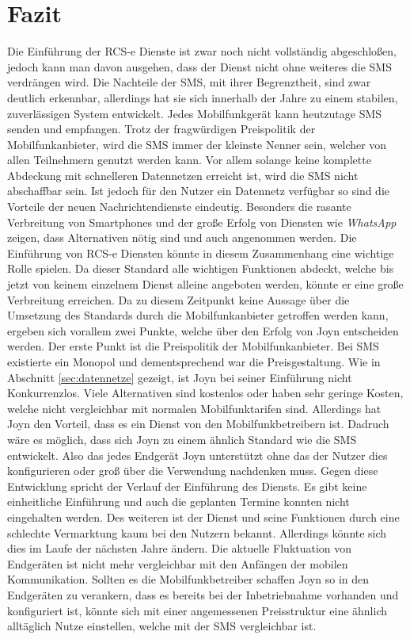 \documentclass[german,12pt,a4paper]{article}
\begin{document}


\section{Fazit} %
\label{sec:fazit}

Die Einführung der RCS-e Dienste ist zwar noch nicht vollständig abgeschloßen, jedoch
kann man davon ausgehen, dass der Dienst nicht ohne weiteres die SMS verdrängen wird. Die
Nachteile der SMS, mit ihrer Begrenztheit, sind zwar deutlich erkennbar, allerdings hat sie sich innerhalb
der Jahre zu einem stabilen, zuverlässigen System entwickelt. Jedes Mobilfunkgerät kann
heutzutage SMS senden und empfangen. Trotz der fragwürdigen Preispolitik der Mobilfunkanbieter,
wird die SMS immer der kleinste Nenner sein, welcher von allen Teilnehmern genutzt werden kann.
Vor allem solange keine komplette Abdeckung mit schnelleren Datennetzen erreicht ist, wird die
SMS nicht abschaffbar sein. Ist jedoch für den Nutzer ein Datennetz verfügbar so sind die
Vorteile der neuen Nachrichtendienste eindeutig. Besonders die rasante Verbreitung von
Smartphones und der große Erfolg von Diensten wie \textit{WhatsApp} zeigen, dass
Alternativen nötig sind und auch angenommen werden. Die Einführung von RCS-e Diensten könnte in
diesem Zusammenhang eine wichtige Rolle spielen. Da dieser Standard alle wichtigen Funktionen
abdeckt, welche bis jetzt von keinem einzelnem Dienst alleine angeboten werden, könnte er eine große
Verbreitung erreichen. Da zu diesem Zeitpunkt keine Aussage über die Umsetzung des Standards
durch die Mobilfunkanbieter getroffen werden kann, ergeben sich vorallem zwei Punkte, welche über
den Erfolg von Joyn entscheiden werden. Der erste Punkt ist die Preispolitik der
Mobilfunkanbieter. Bei SMS existierte ein Monopol und dementsprechend war die Preisgestaltung. Wie
in Abschnitt \ref{sec:datennetze} gezeigt, ist Joyn bei seiner Einführung nicht Konkurrenzlos.
Viele Alternativen sind kostenlos oder haben sehr geringe Kosten, welche nicht vergleichbar mit
normalen Mobilfunktarifen sind. Allerdings hat Joyn den Vorteil, dass es ein Dienst von den
Mobilfunkbetreibern ist. Dadruch wäre es möglich, dass sich Joyn zu einem ähnlich Standard wie die
SMS entwickelt. Also das jedes Endgerät Joyn unterstützt ohne das der Nutzer
dies konfigurieren oder groß über die Verwendung nachdenken muss. Gegen diese
Entwicklung spricht der Verlauf der Einführung des Diensts. Es gibt keine einheitliche Einführung und auch
die geplanten Termine konnten nicht eingehalten werden. Des weiteren ist der Dienst und seine
Funktionen  durch eine schlechte Vermarktung kaum bei den Nutzern bekannt. Allerdings
könnte sich dies im Laufe der nächsten Jahre ändern. Die aktuelle Fluktuation von Endgeräten
ist nicht mehr vergleichbar mit den Anfängen der mobilen Kommunikation. Sollten es die
Mobilfunkbetreiber schaffen Joyn so in den Endgeräten zu verankern, dass es bereits bei der
Inbetriebnahme vorhanden und konfiguriert ist, könnte sich mit einer angemessenen Preisstruktur
eine ähnlich alltäglich Nutze einstellen, welche mit der SMS vergleichbar ist.


\clearpage

\end{document}
